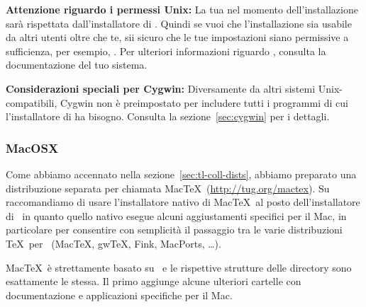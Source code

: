 \documentclass{article}
\begin{document}
\textbf{Attenzione riguardo i permessi Unix:} La tua  nel
momento dell'installazione sarà rispettata dall'installatore di \TL{}.
Quindi se vuoi che l'installazione sia usabile da altri utenti oltre che
te, sii sicuro che le tue impostazioni siano permissive a sufficienza, per
esempio, . Per ulteriori informazioni riguardo
, consulta la documentazione del tuo sistema.

\textbf{Considerazioni speciali per Cygwin:} Diversamente da altri sistemi
Unix-compatibili, Cygwin non è preimpostato per includere tutti i
programmi di cui l'installatore di \TL{} ha bisogno. Consulta la
sezione~\ref{sec:cygwin} per i dettagli.


\subsubsection{MacOSX}

Come abbiamo accennato nella sezione~\ref{sec:tl-coll-dists}, abbiamo
preparato una distribuzione separata per \MacOSX chiamata Mac\TeX\
(\url{http://tug.org/mactex}). Su \MacOSX raccomandiamo di usare
l'installatore nativo di Mac\TeX\ al posto dell'installatore di \TL\ in
quanto quello nativo esegue alcuni aggiustamenti specifici per il Mac, in
particolare per consentire con semplicità il passaggio tra le varie
distribuzioni \TeX\ per \MacOSX\ (Mac\TeX, gw\TeX, Fink, MacPorts,
\ldots).


Mac\TeX\ è strettamente basato su \TL\ e le rispettive strutture delle
directory sono esattamente le stessa. Il primo aggiunge alcune ulteriori
cartelle con documentazione e applicazioni specifiche per il Mac.
\end{document}
